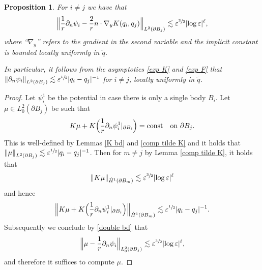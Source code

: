\documentclass[JEP,XML,SOM,Unicode,published]{cedram}
\let\epsilon\varepsilon
\newcommand{\const}{\textup{const}}
\newtheorem{proposition}[theorem]{Proposition}
\theoremstyle{definition}
\newcommand\norm[1]{\left\lVert #1\right\rVert}
\newcommand\Bnorm[1]{\Bigl\lVert #1\Bigr\rVert}
\newcommand\eq{=}
\let\de\partial
\let\eps\epsilon
\begin{document}
\begin{proposition}\label{1st order exp}
For $i\neq j$ we have that\vspace*{-3pt}
\begin{align*}
\Bnorm{\frac{1}{r}\de_n\psi_i-\frac{2}{r}n\cdot\nabla_yK(q_i,q_j)}_{L^2(\de B_j)}\lesssim \eps^{\sfrac{3}{2}}|{\log\eps}|^\ell,
\end{align*}
where ``$\nabla_y$'' refers to the gradient in the second variable and the implicit constant is bounded locally uniformly in $\tilde{q}$.

In particular, it follows from the asymptotics \eqref{exp K} and \eqref{exp F} that $\norm{\de_n\psi_i}_{L^2(\de B_j)}\lesssim \eps^{\sfrac{1}{2}}|q_i-q_j|^{-1}$ for $i\neq j$, locally uniformly in $\tilde{q}$.
\end{proposition}
\begin{proof}
Let $\psi_i^1$ be the potential in case there is only a single body $B_i$.
Let $\mu\in L_0^2(\de B_j)$ be such that\vspace*{-3pt}
\begin{align*}
K\mu+K\Bigl(\frac{1}{r}\de_n\psi_i^1|_{\de B_i}\Bigr)\eq \const \quad\text{on $\de B_j$}.
\end{align*}
This is well-defined by Lemmas \ref{K bd} and \ref{comp tilde K} and it holds that $\norm{\mu}_{L^2(\de B_j)}\lesssim \eps^{\sfrac{1}{2}}|q_i-\nobreak q_j|^{-1}$.
Then for $m\neq j$ by Lemma \ref{comp tilde K}, it holds that\vspace*{-3pt}
\begin{align*}
\norm{K\mu}_{\dot{H}^1(\de B_m)}\lesssim \eps^{\sfrac{3}{2}}|{\log\eps}|^\ell
\end{align*}
and hence\vspace*{-3pt}
\begin{align*}
\Bnorm{K\mu+K\Bigl(\frac{1}{r}\de_n\psi_i^1|_{\de B_i}\Bigr)}_{\dot{H}^1(\de B_m)}\lesssim \eps^{\sfrac{1}{2}}|q_i-q_j|^{-1}.
\end{align*}
Subsequently we conclude by \eqref{double bd} that\vspace*{-3pt}
\begin{align}\label{comp mu}
\Bnorm{\mu-\frac{1}{r}\de_n\psi_i}_{L_0^2(\de B_j)}\lesssim \eps^{\sfrac{3}{2}}|{\log\eps}|^\ell,
\end{align}
and therefore it suffices to compute $\mu$.


\end{proof}
\end{document}
